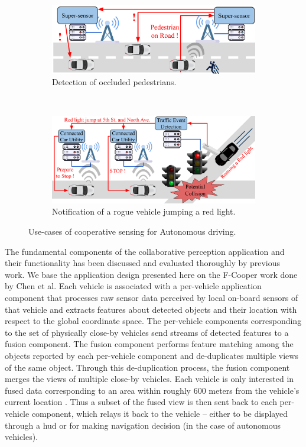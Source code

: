 \begin{figure}[t!]
    \centering
    \begin{subfigure}[t]{0.45\textwidth}
        \centering
        \includegraphics[width=\textwidth]{figures/apps/pedestrian}
        \caption{Detection of occluded pedestrians.}
        \label{fig:pedestrian}
    \end{subfigure}%
    ~ 
    \begin{subfigure}[t]{0.45\textwidth}
        \centering
        \includegraphics[width=\textwidth]{figures/apps/redlight}
        \caption{Notification of a rogue vehicle jumping a red light.}
        \label{fig:redlight}
    \end{subfigure}
    \caption{Use-cases of cooperative sensing for Autonomous driving.}
\end{figure}
\par The fundamental components of the collaborative perception application and their functionality has been discussed and evaluated thoroughly by previous work\cite{fcooper, fusioneye, avr}. We base the application design presented here on the F-Cooper \cite{fcooper} work done by Chen et al. Each vehicle is associated with a per-vehicle application component that processes raw sensor data perceived by local on-board sensors of that vehicle and extracts features about detected objects and their location with respect to the global coordinate space.  The per-vehicle components corresponding to the set of physically close-by vehicles send streams of detected features to a fusion component. The fusion component performs feature matching among the objects reported by each per-vehicle component and de-duplicates  multiple views of the same object. Through this de-duplication process, the fusion component merges the views of multiple close-by vehicles.  Each vehicle is only interested in fused data corresponding to an area within roughly 600 meters from the vehicle's current location \cite{talkycars}. Thus a subset of the fused view is then sent back to each per-vehicle component, which relays it back to the vehicle -- either to be displayed through a \gls{hud} or for making navigation decision (in the case of autonomous vehicles).

